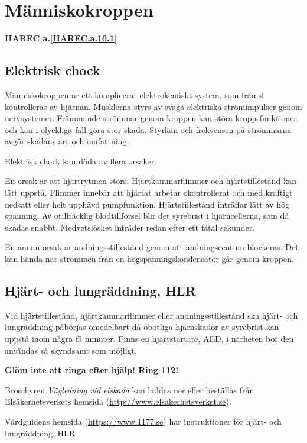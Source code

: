\section{Människokroppen}
\textbf{
HAREC a.\ref{HAREC.a.10.1}\label{myHAREC.a.10.1}
}

\subsection{Elektrisk chock}

Människokroppen är ett komplicerat elektrokemiskt system, som främst
kontrolleras av hjärnan. Musklerna styrs av svaga elektriska
strömimpulser genom nervsystemet. Främmande strömmar genom kroppen kan
störa kroppsfunktioner och kan i olyckliga fall göra stor
skada. Styrkan och frekvensen på strömmarna avgör skadans art och
omfattning.

Elektrisk chock kan döda av flera orsaker.

En orsak är att hjärtrytmen störs. Hjärtkammarflimmer och
hjärtstillestånd kan lätt uppstå. Flimmer innebär att hjärtat arbetar
okontrollerat och med kraftigt nedsatt eller helt upphävd
pumpfunktion. Hjärtstillestånd inträffar lätt av hög spänning. Av
otillräcklig blodtillförsel blir det syrebrist i hjärncellerna, som då
skadas snabbt. Medvetslöshet inträder redan efter ett fåtal sekunder.

En annan orsak är andningsstillestånd genom att andningscentum
blockeras. Det kan hända när strömmen från en högspänningskondensator
går genom kroppen.

\subsection{Hjärt- och lungräddning, HLR}

Vid hjärtstillestånd, hjärtkammarflimmer eller andningsstillestånd ska
hjärt- och lungräddning påbörjas omedelbart då obotliga hjärnskador av
syrebrist kan uppstå inom några få minuter. Finns en hjärtstartare,
AED, i närheten bör den användas så skyndsamt som möjligt.

\textbf{Glöm inte att ringa efter hjälp! Ring 112!}

Broschyren \emph{Vägledning vid elskada} kan laddas ner eller beställas från
Elsäkerhetsverkets hemsida (\url{http://www.elsakerhetsverket.se}).

Vårdguidens hemsida (\url{https://www.1177.se}) har instruktioner för hjärt-
och lungräddning, HLR.


